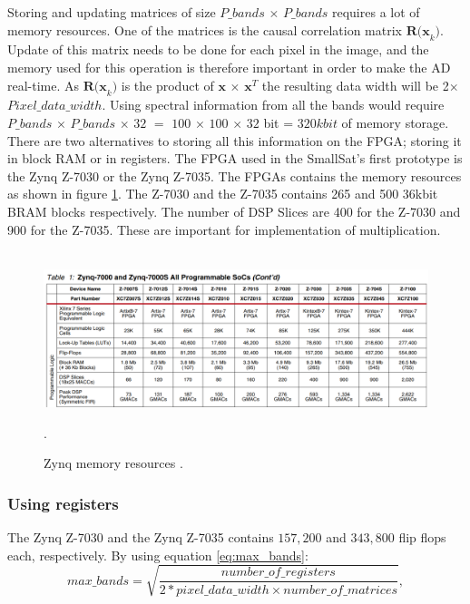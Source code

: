 Storing and updating matrices of size $P\_bands$ $\times$ $P\_bands$  requires a lot of memory resources. %
One of the matrices is the causal correlation matrix $\textbf{R(x}_k)$. Update of this matrix needs to be done for each pixel in the image, and the memory used for this operation is therefore important in order to make the AD real-time.  As $\textbf{R(x}_k)$ is the product of $\textbf{x}$ $\times$ $\textbf{x}^T$ the resulting data width will be 2$\times$ $Pixel\_data\_width$. Using spectral information from all the bands would require $P\_bands$ $\times$ $P\_bands$ $\times$ $32$ $=$ $100$ $\times$ $100$ $\times$ $32$ bit = $320 kbit$ of memory storage. 
\\

There are two alternatives to storing all this information on the FPGA; storing it in block RAM or in registers. The FPGA used in the SmallSat's first prototype is the Zynq Z-7030 or the Zynq Z-7035. 
The FPGAs contains the memory resources as shown in figure \ref{fig:zynq_memory_resources}. The Z-7030 and the Z-7035 contains 265 and 500 36kbit BRAM blocks respectively. The number of DSP Slices are 400 for the Z-7030 and 900 for the Z-7035. These are important for implementation of multiplication. 





\begin{figure}[H]
\hbox{\hspace*{-1cm}                               \includegraphics[scale=0.45]{images/zynq_memory_resources.PNG}}
  \caption{Zynq memory resources \cite{cite:mem_resources_zynq}.} 
  \label{fig:zynq_memory_resources}.
\end{figure}

\subsubsection{Using registers}
The Zynq Z-7030 and the Zynq Z-7035 contains $157,200$ and $343,800$ flip flops each, respectively. By using equation \ref{eq:max_bands}:%
\begin{equation}
    max\_bands= \sqrt{\frac{number\_of\_registers}{2*pixel\_data\_width \times number\_of\_matrices}},
    \label{eq:max_bands}
\end{equation}

